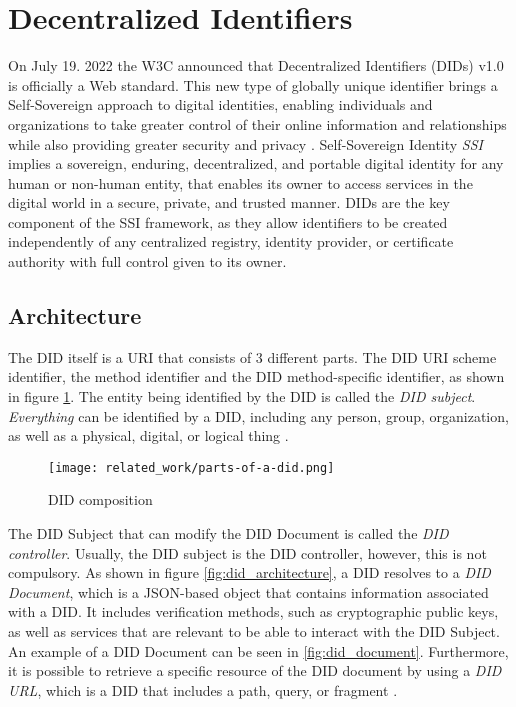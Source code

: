 \section{Decentralized Identifiers} \label{section:dids}

On July 19. 2022 the W3C announced that Decentralized Identifiers (DIDs) v1.0 is officially a Web standard. This new type of globally unique identifier brings a Self-Sovereign approach to digital identities, enabling individuals and organizations to take greater control of their online information and relationships while also providing greater security and privacy \cite{w3c_2022}. Self-Sovereign Identity \emph{SSI} implies a sovereign, enduring, decentralized, and portable digital identity for any human or non-human entity, that enables its owner to access services in the digital world in a secure, private, and trusted manner. DIDs are the key component of the SSI framework, as they allow identifiers to be created independently of any centralized registry, identity provider, or certificate authority with full control given to its owner\cite{Naik_Jenkins_2021}\cite{sporny_longley_sabadello_reed_steele_2021}.

\subsection{Architecture}

The DID itself is a URI that consists of 3 different parts. The DID URI scheme identifier, the method identifier and the DID method-specific identifier, as shown in figure \ref{fig:did}. The entity being identified by the DID is called the \emph{DID subject}. \emph{Everything} can be identified by a DID, including any person, group, organization, as well as a physical, digital, or logical thing \cite{Conway_Hughes_Ma_Poole_Riedel_2019}\cite{sporny_longley_sabadello_reed_steele_2021}.

\begin{figure}[h]
  \centering
  \texttt{[image: related\_work/parts-of-a-did.png]}
  \caption{DID composition \cite{sporny_longley_sabadello_reed_steele_2021}}
  \label{fig:did}
\end{figure}


The DID Subject that can modify the DID Document is called the \emph{DID controller}. Usually, the DID subject is the DID controller, however, this is not compulsory. As shown in figure \ref{fig:did_architecture}, a DID resolves to a \emph{DID Document}, which is a JSON-based object that contains information associated with a DID. It includes verification methods, such as cryptographic public keys, as well as services that are relevant to be able to interact with the DID Subject. An example of a DID Document can be seen in \ref{fig:did_document}. Furthermore, it is possible to retrieve a specific resource of the DID document by using a \emph{DID URL}, which is a DID that includes a path, query, or fragment \cite{sporny_longley_sabadello_reed_steele_2021}.

